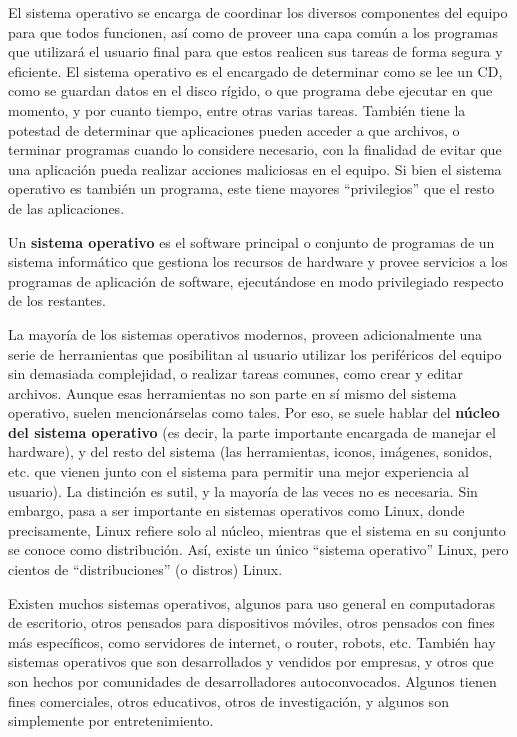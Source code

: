 El sistema operativo se encarga de coordinar los diversos componentes del equipo
para que todos funcionen, así como de proveer una capa común a los programas que
utilizará el usuario final para que estos realicen sus tareas de forma segura y
eficiente. El sistema operativo es el encargado de determinar como se lee un CD,
como se guardan datos en el disco rígido, o que programa debe ejecutar en que
momento, y por cuanto tiempo, entre otras varias tareas. También tiene la potestad
de determinar que aplicaciones pueden acceder a que archivos, o terminar programas
cuando lo considere necesario, con la finalidad de evitar que una aplicación
pueda realizar acciones maliciosas en el equipo. Si bien el sistema operativo
es también un programa, este tiene mayores ``privilegios'' que el resto de las
aplicaciones.

\begin{definition}
    Un \textbf{sistema operativo} es el software principal o conjunto de
    programas de un sistema informático que gestiona los recursos de hardware y
    provee servicios a los programas de aplicación de software, ejecutándose en
    modo privilegiado respecto de los restantes.
    \autocite[cft.]{tanenbaum_2007, turner_1986}
\end{definition}

La mayoría de los sistemas operativos modernos, proveen adicionalmente una serie
de herramientas que posibilitan al usuario utilizar los periféricos del equipo
sin demasiada complejidad, o realizar tareas comunes, como crear y editar
archivos. Aunque esas herramientas no son parte en sí mismo del sistema
operativo, suelen mencionárselas como tales. Por eso, se suele hablar del
\textbf{núcleo del sistema operativo} (es decir, la parte importante
encargada de manejar el hardware), y del resto del sistema (las herramientas,
iconos, imágenes, sonidos, etc. que vienen junto con el sistema para permitir
una mejor experiencia al usuario). La distinción es sutil, y la mayoría de las
veces no es necesaria. Sin embargo, pasa a ser importante en sistemas operativos
como Linux, donde precisamente, Linux refiere solo al núcleo, mientras que
el sistema en su conjunto se conoce como distribución. Así, existe un
único ``sistema operativo'' Linux, pero cientos de ``distribuciones''
(o distros) Linux.

Existen muchos sistemas operativos, algunos para uso general en computadoras de
escritorio, otros pensados para dispositivos móviles, otros pensados con fines
más específicos, como servidores de internet, o router, robots, etc. También
hay sistemas operativos que son desarrollados y vendidos por empresas, y otros
que son hechos por comunidades de desarrolladores autoconvocados. Algunos tienen
fines comerciales, otros educativos, otros de investigación, y algunos son
simplemente por entretenimiento.

